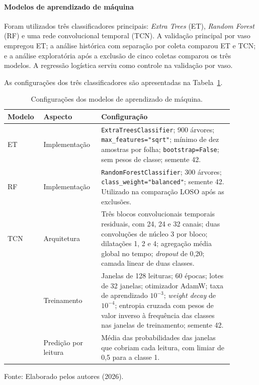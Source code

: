 \paragraph{Modelos de aprendizado de máquina}
\label{subsec:modelos}

Foram utilizados três classificadores principais:
\emph{Extra Trees} (ET), \emph{Random Forest} (RF) e uma rede
convolucional temporal (TCN). A validação principal por vaso empregou
ET; a análise histórica com separação por coleta comparou ET e TCN; e
a análise exploratória após a exclusão de cinco coletas comparou os
três modelos. A regressão logística serviu como controle na validação por vaso.

As configurações dos três classificadores são apresentadas na
Tabela~\ref{tab:configuracao_modelos}.

\begin{table}[H]
    \centering
    \small
    \caption{Configurações dos modelos de aprendizado de máquina.}
    \label{tab:configuracao_modelos}
    \begin{tabular}{p{0.13\linewidth}p{0.22\linewidth}p{0.54\linewidth}}
        \hline
        \textbf{Modelo} & \textbf{Aspecto} & \textbf{Configuração} \\
        \hline
        ET & Implementação &
        \texttt{ExtraTreesClassifier}; 900 árvores;
        \texttt{max\_features="sqrt"}; mínimo de dez amostras por folha;
        \texttt{bootstrap=False}; sem pesos de classe; semente 42. \\
        \hline
        RF & Implementação &
        \texttt{RandomForestClassifier}; 300 árvores;
        \texttt{class\_weight="balanced"}; semente 42. Utilizado na
        comparação LOSO após as exclusões. \\
        \hline
        TCN & Arquitetura &
        Três blocos convolucionais temporais residuais, com 24, 24 e
        32 canais; duas convoluções de núcleo 3 por bloco; dilatações
        1, 2 e 4; agregação média global no tempo; \emph{dropout} de
        0,20; camada linear de duas classes. \\
        & Treinamento &
        Janelas de 128 leituras; 60 épocas; lotes de 32 janelas;
        otimizador AdamW; taxa de aprendizado $10^{-3}$;
        \emph{weight decay} de $10^{-4}$; entropia cruzada com pesos
        de valor inverso à frequência das classes nas
        janelas de treinamento; semente 42. \\
        & Predição por leitura &
        Média das probabilidades das janelas que cobriam cada leitura,
        com limiar de 0,5 para a classe 1. \\
        \hline
    \end{tabular}

    \vspace{0.1cm}
    {\footnotesize Fonte: Elaborado pelos autores (2026).}
\end{table}

